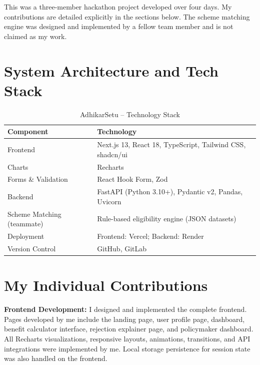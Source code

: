 \documentclass{book}
\begin{document}
\par\noindent This was a three-member hackathon project developed over four days. My contributions are detailed explicitly in the sections below. The scheme matching engine was designed and implemented by a fellow team member and is not claimed as my work.

\section{System Architecture and Tech Stack}

\begin{table}[!h]
\begin{center}
\small
\begin{tabular}{|l|l|}
\hline
\textbf{Component} & \textbf{Technology} \\
\hline
Frontend & Next.js 13, React 18, TypeScript, Tailwind CSS, shadcn/ui \\
Charts & Recharts \\
Forms \& Validation & React Hook Form, Zod \\
Backend & FastAPI (Python 3.10+), Pydantic v2, Pandas, Uvicorn \\
Scheme Matching (teammate) & Rule-based eligibility engine (JSON datasets) \\
Deployment & Frontend: Vercel; Backend: Render \\
Version Control & GitHub, GitLab \\
\hline
\end{tabular}
\caption{AdhikarSetu -- Technology Stack}
\label{tab:adhi_stack}
\end{center}
\end{table}

\section{My Individual Contributions}

\par\noindent \textbf{Frontend Development:} I designed and implemented the complete frontend. Pages developed by me include the landing page, user profile page, dashboard, benefit calculator interface, rejection explainer page, and policymaker dashboard. All Recharts visualizations, responsive layouts, animations, transitions, and API integrations were implemented by me. Local storage persistence for session state was also handled on the frontend.
\end{document}
